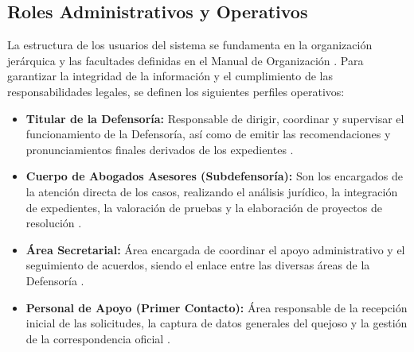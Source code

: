 \subsection{Roles Administrativos y Operativos}
La estructura de los usuarios del sistema se fundamenta en la organización jerárquica y las facultades definidas en el Manual de Organización \cite{4} . Para garantizar la integridad de la información y el cumplimiento de las responsabilidades legales, se definen los siguientes perfiles operativos:
\begin{itemize}
    \item \textbf{Titular de la Defensoría:} Responsable de dirigir, coordinar y supervisar el funcionamiento de la Defensoría, así como de emitir las recomendaciones y pronunciamientos finales derivados de los expedientes \cite{4} .
    \item \textbf{Cuerpo de Abogados Asesores (Subdefensoría):} Son los encargados de la atención directa de los casos, realizando el análisis jurídico, la integración de expedientes, la valoración de pruebas y la elaboración de proyectos de resolución \cite{4} .
    \item \textbf{Área Secretarial:} Área encargada de coordinar el apoyo administrativo y el seguimiento de acuerdos, siendo el enlace entre las diversas áreas de la Defensoría \cite{4} .
    \item \textbf{Personal de Apoyo (Primer Contacto):} Área responsable de la recepción inicial de las solicitudes, la captura de datos generales del quejoso y la gestión de la correspondencia oficial \cite{4} .
\end{itemize}

